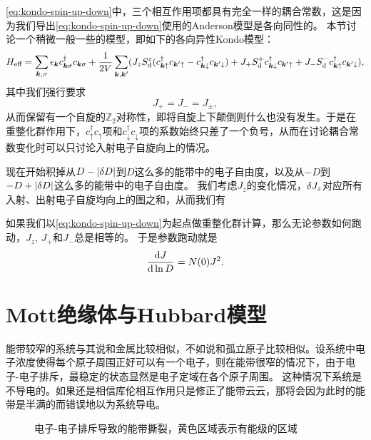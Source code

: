\eqref{eq:kondo-spin-up-down}中，三个相互作用项都具有完全一样的耦合常数，这是因为我们导出\eqref{eq:kondo-spin-up-down}使用的Anderson模型是各向同性的。
本节讨论一个稍微一般一些的模型，即如下的各向异性Kondo模型：
\begin{equation}
    {H}_\text{eff} = \sum_{\vb*{k}, \sigma} \epsilon_{\vb*{k}} {c}^\dagger_{\vb*{k} \sigma} {c}_{\vb*{k} \sigma} + \frac{1}{2V} \sum_{\vb*{k}, \vb*{k}'} (
        J_z {S}_\text{d}^z ({c}^\dagger_{\vb*{k} \uparrow} {c}_{\vb*{k}' \uparrow} - {c}^\dagger_{\vb*{k} \downarrow} {c}_{\vb*{k}' \downarrow})
        + J_+ {S}^+_\text{d} {c}^\dagger_{\vb*{k} \downarrow} {c}_{\vb*{k}' \uparrow}
        + J_- {S}^-_\text{d} {c}^\dagger_{\vb*{k} \uparrow} {c}_{\vb*{k}' \downarrow}
    ),
\end{equation}
其中我们强行要求
\begin{equation}
    J_+ = J_- = J_\pm,
\end{equation}
从而保留有一个自旋的$\mathbb{Z}_2$对称性，即将自旋上下颠倒则什么也没有发生。于是在重整化群作用下，${c}^\dagger_\uparrow {c}_\uparrow$项和${c}^\dagger_\downarrow {c}_\downarrow$项的系数始终只差了一个负号，从而在讨论耦合常数变化时可以只讨论入射电子自旋向上的情况。

现在开始积掉从$D-\abs{\var{D}}$到$D$这么多的能带中的电子自由度，以及从$-D$到$-D+\abs{\var{D}}$这么多的能带中的电子自由度。
我们考虑$J_z$的变化情况，$\var{J_z}$对应所有入射、出射电子自旋均向上的图之和，从而我们有


如果我们以\eqref{eq:kondo-spin-up-down}为起点做重整化群计算，那么无论参数如何跑动，$J_z$, $J_+$和$J_-$总是相等的。
于是参数跑动就是
\begin{equation}
    \dv{J}{\ln D} = N(0) J^2.
\end{equation}

\section{Mott绝缘体与Hubbard模型}

能带较窄的系统与其说和金属比较相似，不如说和孤立原子比较相似。设系统中电子浓度使得每个原子周围正好可以有一个电子，则在能带很窄的情况下，由于电子-电子排斥，最稳定的状态显然是电子定域在各个原子周围。
这种情况下系统是不导电的。如果还是相信库伦相互作用只是修正了能带云云，那将会因为此时的能带是半满的而错误地以为系统导电。

\begin{figure}
    \centering
    
    \caption{电子-电子排斥导致的能带撕裂，黄色区域表示有能级的区域}
    \label{fig:mott-band}
\end{figure}

